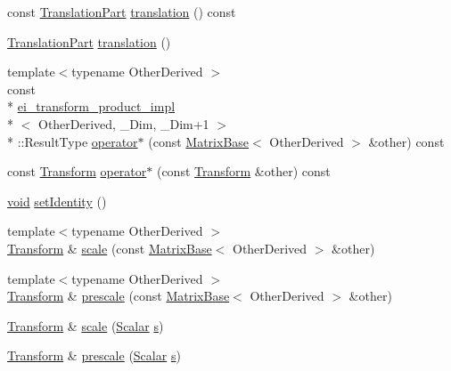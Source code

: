 \begin{DoxyCompactItemize}
\item 
const \hyperlink{class_transform_a00ccb56dcd1ca99fb61b87fa229f0440}{Translation\-Part} \hyperlink{class_transform_a862773a2cdeb2b0c143f02df9f1fcf7b}{translation} () const 
\item 
\hyperlink{class_transform_a00ccb56dcd1ca99fb61b87fa229f0440}{Translation\-Part} \hyperlink{class_transform_a7032132e9ccabec22195470c03602a46}{translation} ()
\item 
{\footnotesize template$<$typename Other\-Derived $>$ }\\const \\*
\hyperlink{structei__transform__product__impl}{ei\-\_\-transform\-\_\-product\-\_\-impl}\\*
$<$ Other\-Derived, \-\_\-\-Dim, \-\_\-\-Dim+1 $>$\\*
\-::Result\-Type \hyperlink{class_transform_a0baed10b46867b980dfded894c6d317d}{operator$\ast$} (const \hyperlink{class_matrix_base}{Matrix\-Base}$<$ Other\-Derived $>$ \&other) const 
\item 
const \hyperlink{class_transform}{Transform} \hyperlink{class_transform_a99c8d216d9e7c012076cbac12c8c8609}{operator$\ast$} (const \hyperlink{class_transform}{Transform} \&other) const 
\item 
\hyperlink{group___u_a_v_objects_plugin_ga444cf2ff3f0ecbe028adce838d373f5c}{void} \hyperlink{class_transform_a57e085242a364ef72f3ffbdfc35b4ab2}{set\-Identity} ()
\item 
{\footnotesize template$<$typename Other\-Derived $>$ }\\\hyperlink{class_transform}{Transform} \& \hyperlink{class_transform_ade030e551db8eb65495089eedd166f56}{scale} (const \hyperlink{class_matrix_base}{Matrix\-Base}$<$ Other\-Derived $>$ \&other)
\item 
{\footnotesize template$<$typename Other\-Derived $>$ }\\\hyperlink{class_transform}{Transform} \& \hyperlink{class_transform_accf2512ebd9d80625437d39d8c3759a5}{prescale} (const \hyperlink{class_matrix_base}{Matrix\-Base}$<$ Other\-Derived $>$ \&other)
\item 
\hyperlink{class_transform}{Transform} \& \hyperlink{class_transform_abe48e1b30fe419d2de5f92c1bb951fda}{scale} (\hyperlink{class_transform_a0468fefb805493a70f2100c7faf05489}{Scalar} \hyperlink{glext_8h_ad585a1393cfa368fa9dc3d8ebff640d5}{s})
\item 
\hyperlink{class_transform}{Transform} \& \hyperlink{class_transform_a2be291a4e4933fca76c75d3447fac3d7}{prescale} (\hyperlink{class_transform_a0468fefb805493a70f2100c7faf05489}{Scalar} \hyperlink{glext_8h_ad585a1393cfa368fa9dc3d8ebff640d5}{s})

\end{DoxyCompactItemize}
